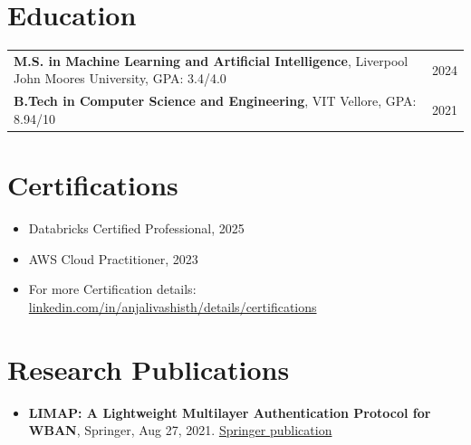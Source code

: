 \documentclass[10pt,letterpaper]{article}
\begin{document}
\section*{Education}
\begin{tabularx}{\textwidth}{X r}
\textbf{M.S. in Machine Learning and Artificial Intelligence}, Liverpool John Moores University, GPA: 3.4/4.0 & 2024 \\
\textbf{B.Tech in Computer Science and Engineering}, VIT Vellore, GPA: 8.94/10 & 2021 \\
\end{tabularx}

\section*{Certifications}
\begin{itemize}
  \item Databricks Certified Professional, 2025
  \item AWS Cloud Practitioner, 2023
  \item For more Certification details: \href{https://www.linkedin.com/in/anjalivashisth/details/certifications/}{linkedin.com/in/anjalivashisth/details/certifications}
\end{itemize}

\section*{Research Publications}
\begin{itemize}
  \item \textbf{LIMAP: A Lightweight Multilayer Authentication Protocol for WBAN}, Springer, Aug 27, 2021. \href{https://link.springer.com/article/10.1007/s11277-021-08853-x}{Springer publication}
\end{itemize}
\end{document}

